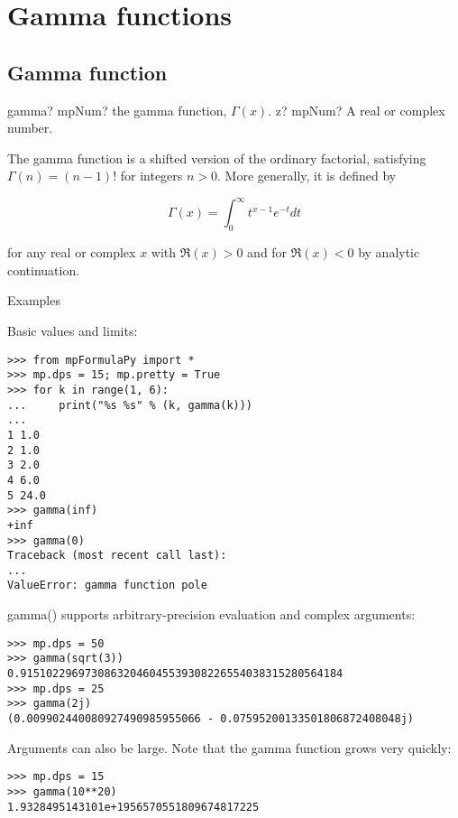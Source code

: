 \newpage
\section{Gamma functions}

\subsection{Gamma function}

\begin{mpFunctionsExtract}
	\mpFunctionOne
	{gamma? mpNum? the gamma function, $\Gamma(x)$.}
	{z? mpNum? A real or complex number.}
\end{mpFunctionsExtract}

\vpara
The gamma function is a shifted version of the ordinary factorial, satisfying $\Gamma(n)=(n-1)!$ for integers $n>0$. More generally, it is defined by 

\begin{equation}
\Gamma(x)=\int_0^{\infty} t^{x-1} e^{-t} dt
\end{equation}

for any real or complex $x$ with $\Re(x)>0$ and for $\Re(x)<0$ by analytic continuation.

Examples

Basic values and limits:

\begin{lstlisting}
>>> from mpFormulaPy import *
>>> mp.dps = 15; mp.pretty = True
>>> for k in range(1, 6):
...     print("%s %s" % (k, gamma(k)))
...
1 1.0
2 1.0
3 2.0
4 6.0
5 24.0
>>> gamma(inf)
+inf
>>> gamma(0)
Traceback (most recent call last):
...
ValueError: gamma function pole
\end{lstlisting}

gamma() supports arbitrary-precision evaluation and complex arguments:

\begin{lstlisting}
>>> mp.dps = 50
>>> gamma(sqrt(3))
0.91510229697308632046045539308226554038315280564184
>>> mp.dps = 25
>>> gamma(2j)
(0.009902440080927490985955066 - 0.07595200133501806872408048j)
\end{lstlisting}


Arguments can also be large. Note that the gamma function grows very quickly:

\begin{lstlisting}
>>> mp.dps = 15
>>> gamma(10**20)
1.9328495143101e+1956570551809674817225
\end{lstlisting}



